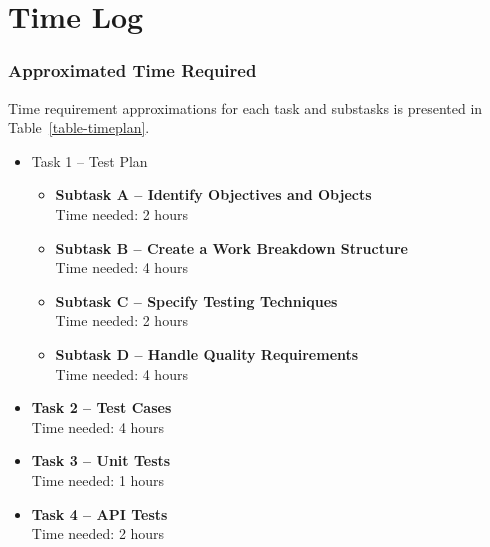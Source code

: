 %
%
%
%


\section{Time Log}\label{time-log}


\subsubsection{Approximated Time Required}\label{approximated-time-required}
Time requirement approximations for each task and substasks is presented 
in Table~\ref{table-timeplan}.

\begin{itemize}
\item
  Task 1 -- Test Plan

  \begin{itemize}
  \item
    \textbf{Subtask A -- Identify Objectives and Objects}\\
    Time needed: 2 hours
  \item
    \textbf{Subtask B -- Create a Work Breakdown Structure}\\
    Time needed: 4 hours
  \item
    \textbf{Subtask C -- Specify Testing Techniques}\\
    Time needed: 2 hours
  \item
    \textbf{Subtask D -- Handle Quality Requirements}\\
    Time needed: 4 hours
  \end{itemize}
\item
  \textbf{Task 2 -- Test Cases}\\
  Time needed: 4 hours
\item
  \textbf{Task 3 -- Unit Tests}\\
  Time needed: 1 hours
\item
  \textbf{Task 4 -- API Tests}\\
  Time needed: 2 hours
\end{itemize}

